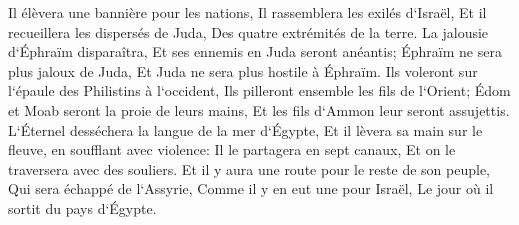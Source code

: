 \verse Il élèvera une bannière pour les nations, Il rassemblera les exilés d`Israël, Et il recueillera les dispersés de Juda, Des quatre extrémités de la terre. 
\verse La jalousie d`Éphraïm disparaîtra, Et ses ennemis en Juda seront anéantis; Éphraïm ne sera plus jaloux de Juda, Et Juda ne sera plus hostile à Éphraïm. 
\verse Ils voleront sur l`épaule des Philistins à l`occident, Ils pilleront ensemble les fils de l`Orient; Édom et Moab seront la proie de leurs mains, Et les fils d`Ammon leur seront assujettis. 
\verse L`Éternel desséchera la langue de la mer d`Égypte, Et il lèvera sa main sur le fleuve, en soufflant avec violence: Il le partagera en sept canaux, Et on le traversera avec des souliers. 
\verse Et il y aura une route pour le reste de son peuple, Qui sera échappé de l`Assyrie, Comme il y en eut une pour Israël, Le jour où il sortit du pays d`Égypte. 

\chapter{}


